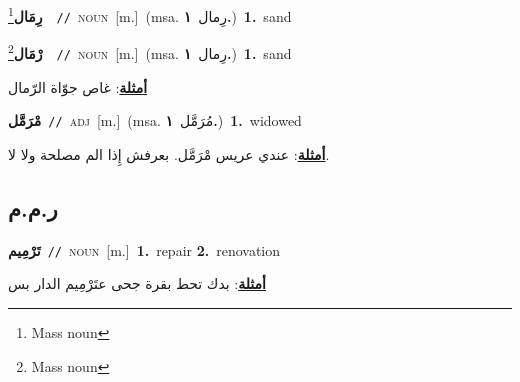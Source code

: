 \documentclass[10pt,a4paper,twoside]{article} %
\begin{document}
\begin{multicols}{2}
{\setlength\topsep{0pt}\textbf{\foreignlanguage{arabic}{رِمَال}}\footnote{Mass noun}\ \ {\color{gray}\texttt{//}\color{black}}\ \textsc{noun}\ [m.]\ \color{gray}(msa. \foreignlanguage{arabic}{رِمال}~\foreignlanguage{arabic}{\textbf{١.}})\color{black}\ \textbf{1.}~sand\ } \vspace{2mm}

{\setlength\topsep{0pt}\textbf{\foreignlanguage{arabic}{رْمَال}}\footnote{Mass noun}\ \ {\color{gray}\texttt{//}\color{black}}\ \textsc{noun}\ [m.]\ \color{gray}(msa. \foreignlanguage{arabic}{رِمال}~\foreignlanguage{arabic}{\textbf{١.}})\color{black}\ \textbf{1.}~sand\  \begin{flushright}\color{gray}\foreignlanguage{arabic}{\textbf{\underline{\foreignlanguage{arabic}{أمثلة}}}: غاص جوّاة الرّمال}\end{flushright}\color{black}} \vspace{2mm}

{\setlength\topsep{0pt}\textbf{\foreignlanguage{arabic}{مْرَمَّل}}\ {\color{gray}\texttt{//}\color{black}}\ \textsc{adj}\ [m.]\ \color{gray}(msa. \foreignlanguage{arabic}{مُرَمَّل}~\foreignlanguage{arabic}{\textbf{١.}})\color{black}\ \textbf{1.}~widowed\  \begin{flushright}\color{gray}\foreignlanguage{arabic}{\textbf{\underline{\foreignlanguage{arabic}{أمثلة}}}: عندي عريس مْرَمَّل. بعرفش إِذا الم مصلحة ولا لا.}\end{flushright}\color{black}} \vspace{2mm}

\vspace{-3mm}
\subsection*{\color{blue}\foreignlanguage{arabic}{ر.م.م}\color{blue}{}} 

{\setlength\topsep{0pt}\textbf{\foreignlanguage{arabic}{تَرْمِيم}}\ {\color{gray}\texttt{//}\color{black}}\ \textsc{noun}\ [m.]\ \textbf{1.}~repair  \textbf{2.}~renovation\  \begin{flushright}\color{gray}\foreignlanguage{arabic}{\textbf{\underline{\foreignlanguage{arabic}{أمثلة}}}: بدك تحط بقرة  جحى عتَرْمِيم الدار بس}\end{flushright}\color{black}} \vspace{2mm}


\end{multicols}
\end{document}
